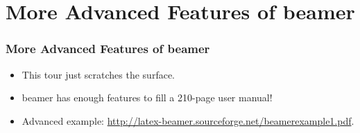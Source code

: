 \documentclass{beamer}
\begin{document}
\section{More Advanced Features of {\sc beamer}}

\begin{frame}
\frametitle{More Advanced Features of {\sc beamer}}

\begin{itemize}

\item This tour just scratches the surface.
\pause

\item {\sc beamer} has enough features to fill a 210-page user manual!
\pause

\item Advanced example:
\url{http://latex-beamer.sourceforge.net/beamerexample1.pdf}.

\end{itemize}

\end{frame}
\end{document}
